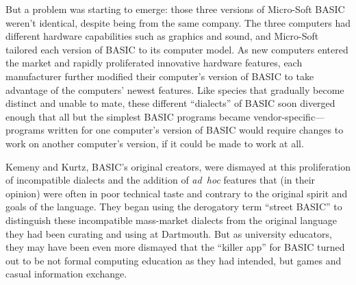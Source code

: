 But a problem was starting to emerge: those three 
versions of Micro-Soft BASIC weren't identical, despite being from the
same company.
The three computers had different hardware capabilities such as
graphics and sound, and Micro-Soft  tailored each version of
BASIC to its computer model.
As new computers entered the market and rapidly proliferated
innovative hardware features, each manufacturer further modified their
computer's version of BASIC to take advantage of the computers' newest
features.
Like species that gradually become distinct and unable to mate, these
different ``dialects'' of BASIC soon diverged enough that all but the
simplest BASIC programs became vendor-specific---programs written for
one computer's version of BASIC would require changes to work on
another computer's version, if it could be made to work at all.

Kemeny and Kurtz, BASIC's original creators, were dismayed at this
proliferation of incompatible dialects and the addition of
\emph{ad~hoc} features that (in their opinion) were often in poor
technical taste and contrary to the original spirit and goals of the
language.
They began using the derogatory term ``street BASIC'' to distinguish
these incompatible mass-market dialects from the original language
they had been curating and using at Dartmouth.
But as university educators, they may have been even more dismayed
that the ``killer app'' for BASIC turned out to be not formal
computing education as they had intended, but games and casual information exchange.


